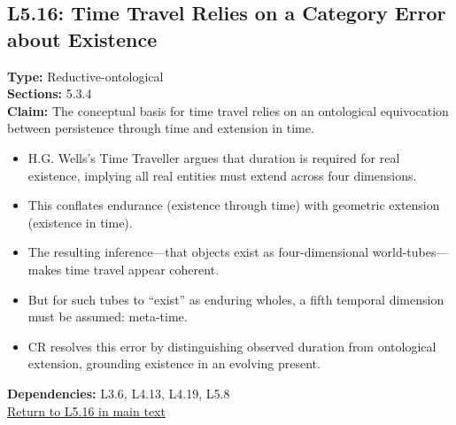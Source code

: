 \documentclass[12pt]{book}
\newcommand{\returnlink}[1]{\hyperref[logic:#1]{Return to #1 in main text}\xspace}
\begin{document}
\subsection*{L5.16: Time Travel Relies on a Category Error about Existence}
\label{appendix:L5.16}
\textbf{Type:} Reductive-ontological \\
\textbf{Sections:} 5.3.4 \\
\textbf{Claim:} The conceptual basis for time travel relies on an ontological equivocation between persistence through time and extension in time.
\begin{itemize}
  \item H.G. Wells's Time Traveller argues that duration is required for real existence, implying all real entities must extend across four dimensions.
  \item This conflates endurance (existence through time) with geometric extension (existence in time).
  \item The resulting inference---that objects exist as four-dimensional world-tubes---makes time travel appear coherent.
  \item But for such tubes to ``exist'' as enduring wholes, a fifth temporal dimension must be assumed: meta-time.
  \item CR resolves this error by distinguishing observed duration from ontological extension, grounding existence in an evolving present.
\end{itemize}
\textbf{Dependencies:} L3.6, L4.13, L4.19, L5.8 \\
\returnlink{L5.16}
\end{document}
